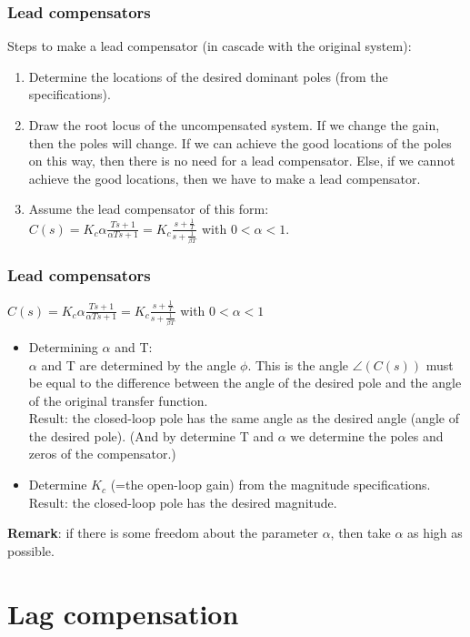 \begin{frame}
	\frametitle{Lead compensators}
	Steps to make a lead compensator (in cascade with the original system):
	\begin{enumerate}
		\item Determine the locations of the desired dominant poles (from the specifications).
		\item Draw the root locus of the uncompensated system. If we change the gain, then the poles will change. If we can achieve the good locations of the poles on this way, then there is no need for a lead compensator. Else, if we cannot achieve the good locations, then we have to make a lead compensator. 
		\item Assume the lead compensator of this form: \\
		$C(s)=K_c \alpha\frac{Ts+1}{\alpha Ts+1}= K_c\frac{s+\frac{1}{T}}{s+\frac{1}{\beta T}}$ with $0<\alpha<1$.
	\end{enumerate}
\end{frame}

\begin{frame}
	\frametitle{Lead compensators}
		$C(s)=K_c \alpha\frac{Ts+1}{\alpha Ts+1}= K_c\frac{s+\frac{1}{T}}{s+\frac{1}{\beta T}}$ with $0<\alpha<1$\\
		\begin{itemize}
			\item Determining $\alpha$ and T:\\
			$\alpha$ and T are determined by the angle $\phi$. This is the angle $\angle(C(s))$ must be equal to the difference between the angle of the desired pole and the angle of the original transfer function. \\
			Result: the closed-loop pole has the same angle as the desired angle (angle of the desired pole). (And by determine T and $\alpha$ we determine the poles and zeros of the compensator.)
			\item Determine $K_c$ (=the open-loop gain) from the magnitude specifications.\\
			Result: the closed-loop pole has the desired magnitude. 
		\end{itemize}
		\textbf{Remark}: if there is some freedom about the parameter $\alpha$, then take $\alpha$ as high as possible. 
\end{frame}

\section{Lag compensation}

